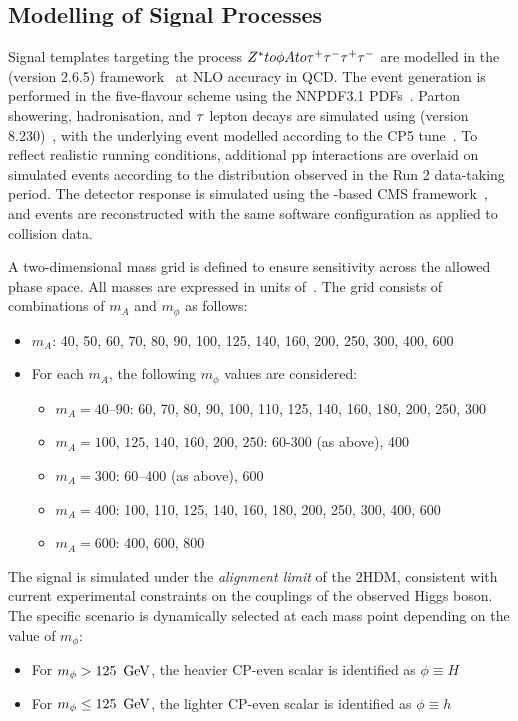 \subsection{Modelling of Signal Processes}
\label{Section:Chapter6_SignalModelling}

Signal templates targeting the process $Z^* to \phi A to \tau^+\tau^-\tau^+\tau^-$ are modelled in the \MCATNLO (version 2.6.5) framework~\cite{MadGraph,FxFx} at NLO accuracy in QCD. The event generation is performed in the five-flavour scheme using the NNPDF3.1 PDFs~\cite{NNPDF}. Parton showering, hadronisation, and $\tau$ lepton decays are simulated using \PYTHIA (version 8.230)~\cite{PYTHIA}, with the underlying event modelled according to the CP5 tune~\cite{CP5_Tune}. To reflect realistic running conditions, additional pp interactions are overlaid on simulated events according to the distribution observed in the Run 2 data-taking period. The detector response is simulated using the \GEANTfour-based CMS framework~\cite{GEANT4}, and events are reconstructed with the same software configuration as applied to collision data.

A two-dimensional mass grid is defined to ensure sensitivity across the allowed phase space. All masses are expressed in units of~\GeV. The grid consists of combinations of $m_A$ and $m_\phi$ as follows:

\begin{itemize}
    \item $m_A$: 40, 50, 60, 70, 80, 90, 100, 125, 140, 160, 200, 250, 300, 400, 600
    \item For each $m_A$, the following $m_\phi$ values are considered:
    \begin{itemize}
        \item $m_A = 40$--$90$: 60, 70, 80, 90, 100, 110, 125, 140, 160, 180, 200, 250, 300
        \item $m_A = 100$, $125$, $140$, $160$, $200$, $250$:  60-300 (as above), 400
        \item $m_A = 300$: 60–400 (as above), 600
        \item $m_A = 400$: 100, 110, 125, 140, 160, 180, 200, 250, 300, 400, 600
        \item $m_A = 600$: 400, 600, 800
    \end{itemize}
\end{itemize}

The signal is simulated under the \textit{alignment limit} of the 2HDM, consistent with current experimental constraints on the couplings of the observed Higgs boson. The specific scenario is dynamically selected at each mass point depending on the value of $m_\phi$:
\begin{itemize}
    \item For $m_\phi > 125~\,\text{Ge\hspace{-.08em}V}$, the heavier CP-even scalar is identified as $\phi \equiv H$
    \item For $m_\phi \leq 125~\,\text{Ge\hspace{-.08em}V}$, the lighter CP-even scalar is identified as $\phi \equiv h$
\end{itemize}

